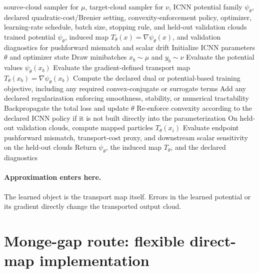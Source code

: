 \begin{algorithm}[ht]
\caption{\texttt{train\_icnn\_brenier\_map}}
\begin{algorithmic}[1]
\Require source-cloud sampler for \(\mu\), target-cloud sampler for \(\nu\), ICNN potential family \(\psi_\theta\), declared quadratic-cost/Brenier setting, convexity-enforcement policy, optimizer, learning-rate schedule, batch size, stopping rule, and held-out validation clouds
\Ensure trained potential \(\psi_\theta\), induced map \(T_\theta(x)=\nabla\psi_\theta(x)\), and validation diagnostics for pushforward mismatch and scalar drift
\State Initialize ICNN parameters \(\theta\) and optimizer state
  \State Draw minibatches \(x_b\sim\mu\) and \(y_b\sim\nu\)
  \State Evaluate the potential values \(\psi_\theta(x_b)\)
  \State Evaluate the gradient-defined transport map \(T_\theta(x_b)=\nabla\psi_\theta(x_b)\)
  \State Compute the declared dual or potential-based training objective, including any required convex-conjugate or surrogate terms
  \State Add any declared regularization enforcing smoothness, stability, or numerical tractability
  \State Backpropagate the total loss and update \(\theta\)
  \State Re-enforce convexity according to the declared ICNN policy if it is not built directly into the parameterization
\EndWhile
\State On held-out validation clouds, compute mapped particles \(T_\theta(x_i)\)
\State Evaluate endpoint pushforward mismatch, transport-cost proxy, and downstream scalar sensitivity on the held-out clouds
\State Return \(\psi_\theta\), the induced map \(T_\theta\), and the declared diagnostics
\end{algorithmic}
\end{algorithm}

\paragraph{Approximation enters here.}
The learned object is the transport map itself.  Errors in the learned potential
or its gradient directly change the transported output cloud.

\section{Monge-gap route: flexible direct-map implementation}
\label{sec:bf-neural-ot-direct-monge-gap}

